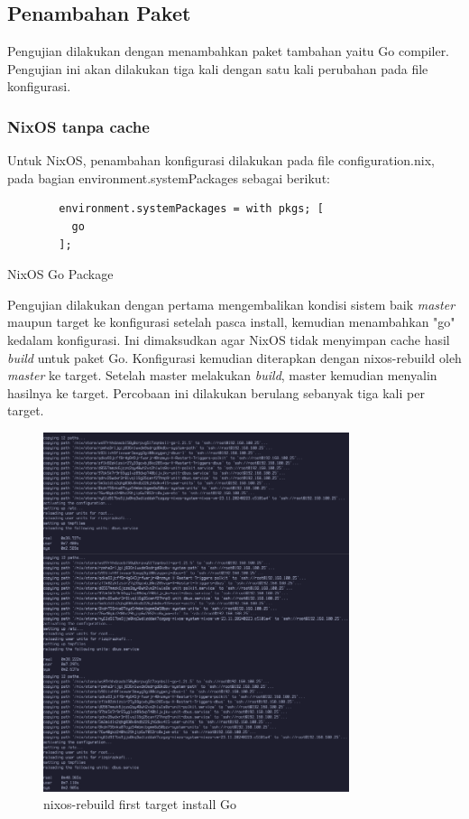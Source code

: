 \documentclass[10pt,twoside]{report}
\newenvironment{code}{\captionsetup{type=listing}}{\vspace{3mm}}
\begin{document}
\begin{adjustwidth}{20pt}{}
	\subsection{Penambahan Paket}
	\begin{adjustwidth}{20pt}{}
		Pengujian dilakukan dengan menambahkan paket tambahan yaitu Go compiler.
		Pengujian ini akan dilakukan tiga kali dengan satu kali perubahan pada file
		konfigurasi.
	\end{adjustwidth}
	\subsubsection{NixOS tanpa cache}
	\begin{adjustwidth}{20pt}{}
		Untuk NixOS, penambahan konfigurasi dilakukan pada file configuration.nix, pada
		bagian environment.systemPackages sebagai berikut:
		\begin{code}
			\begin{verbatim}
        environment.systemPackages = with pkgs; [
          go
        ];
      \end{verbatim}
			\caption{NixOS Go Package}
		\end{code}
		Pengujian dilakukan dengan pertama mengembalikan kondisi sistem baik
		\textit{master} maupun target ke konfigurasi setelah pasca install,
		kemudian menambahkan "go" kedalam konfigurasi. Ini dimaksudkan agar NixOS tidak
		menyimpan cache hasil \textit{build} untuk paket Go. Konfigurasi kemudian
		diterapkan dengan nixos-rebuild oleh \textit{master} ke target. Setelah
		master melakukan \textit{build}, master kemudian menyalin hasilnya ke
		target. Percobaan ini dilakukan berulang sebanyak tiga kali per target.
	\end{adjustwidth}
	\begin{figure}[H]
		\begin{center}
			\includegraphics[width=0.8\textwidth]{images/nix-target/nix-go-25-com.png}
		\end{center}
		\caption{nixos-rebuild first target install Go}
	\end{figure}


\end{adjustwidth}
\end{document}
